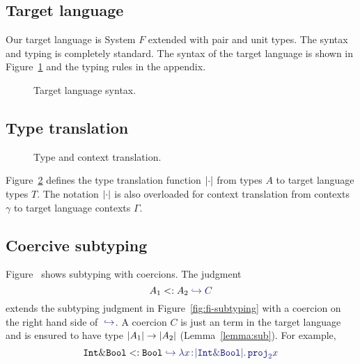 \subsection{Target language}

Our target language is System $F$ extended with pair and unit types. The syntax
and typing is completely standard. The syntax of the target language is shown in
Figure~\ref{fig:f-syntax} and the typing rules in the appendix.
\begin{figure}[h]
  
  \caption{Target language syntax.}
  \label{fig:f-syntax}
\end{figure}



\subsection{Type translation}

\begin{figure}[h]
  
  
  \caption{Type and context translation.}
  \label{fig:type-and-context-translation}
\end{figure}

Figure~\ref{fig:type-and-context-translation} defines the type translation
function $\lvert \cdot \rvert$ from \name types $A$ to target language types $T$. The
notation $\lvert \cdot \rvert$ is also overloaded for context translation from \name
contexts $\gamma$ to target language contexts $\Gamma$.


\subsection{Coercive subtyping}

Figure~ shows subtyping with coercions. The judgment
\[
A_1 \subtype A_2 \yields C
\]
extends the subtyping judgment in Figure~\ref{fig:fi-subtyping} with a coercion
on the right hand side of $ \yields {} $. A coercion $ C $ is just an term
in the target language and is ensured to have type
$ \lvert A_1 \rvert \to \lvert A_2 \rvert $ (Lemma~\ref{lemma:sub}). For example,
\[
\tyint \inter \tybool \subtype \tybool \yields {\lam x {\im {\tyint \inter \tybool}} {\proj 2 x}}
\]

